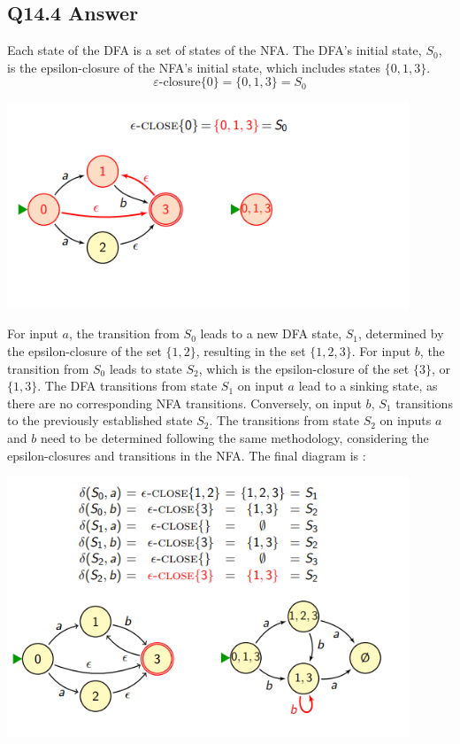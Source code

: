 \documentclass{article}
\begin{document}
\subsection*{Q14.4 Answer}
Each state of the DFA is a set of states of the NFA. The DFA's initial state, $S_0$, is the epsilon-closure of the NFA's initial state, which includes states $\{0, 1, 3\}$.
\[\varepsilon\text{-closure}\{0\} = \{0, 1, 3\} = S_0\]
\begin{center}
    \includegraphics[width=12cm]{4.png}
\end{center}
For input $a$, the transition from $S_0$ leads to a new DFA state, $S_1$, determined by the epsilon-closure of the set $\{1, 2\}$, resulting in the set $\{1, 2, 3\}$. For input $b$, the transition from $S_0$ leads to state $S_2$, which is the epsilon-closure of the set $\{3\}$, or $\{1, 3\}$. The DFA transitions from state $S_1$ on input $a$ lead to a sinking state, as there are no corresponding NFA transitions. Conversely, on input $b$, $S_1$ transitions to the previously established state $S_2$. The transitions from state $S_2$ on inputs $a$ and $b$ need to be determined following the same methodology, considering the epsilon-closures and transitions in the NFA.
The final diagram is : 
\begin{center}
    \includegraphics[width=12cm]{5.png}
\end{center}
\newpage
\end{document}
